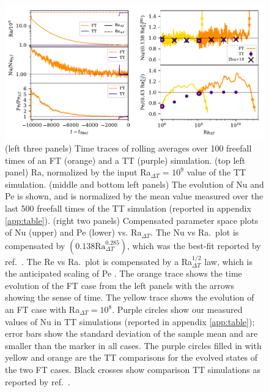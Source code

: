 \documentclass[aps, pre, onecolumn, nofootinbib, notitlepage, groupedaddress, amsfonts, amssymb, amsmath, longbibliography, superscriptaddress]{revtex4-1}
\begin{document}
\begin{figure}[b!]
\includegraphics[width=\textwidth]{./figs/rbc_scalar_comparisons.pdf}
\caption{ 
	(left three panels) Time traces of rolling averages over 100 freefall times of an FT (orange) and a TT (purple) simulation.
	(top left panel) Ra, normalized by the input Ra$_{\Delta T}$ = $10^9$ value of the TT simulation.
	(middle and bottom left panels) The evolution of Nu and Pe is shown, and is normalized by the mean value measured over the last 500 freefall times of the TT simulation (reported in appendix \ref{app:table}).
	(right two panels) Compensated parameter space plots of Nu (upper) and Pe (lower) vs. Ra$_{\Delta T}$.
	The Nu vs Ra.~plot is compensated by $(0.138 \text{Ra}_{\Delta T}^{0.285})$, which was the best-fit reported by ref.~\cite{johnston&doering2009}.
	The Re vs Ra.~plot is compensated by a Ra$_{\Delta T}^{1/2}$ law, which is the anticipated scaling of Pe \cite{ahlers&all2009}.
	The orange trace shows the time evolution of the FT case from the left panels with the arrows showing the sense of time.
	The yellow trace shows the evolution of an FT case with Ra$_{\Delta T} = 10^8$.
	Purple circles show our measured values of Nu in TT simulations (reported in appendix \ref{app:table}); error bars show the standard deviation of the sample mean and are smaller than the marker in all cases.
	The purple circles filled in with yellow and orange are the TT comparisons for the evolved states of the two FT cases.
	Black crosses show comparison TT simulations as reported by ref.~\cite{zhu&all2018}.
\label{fig:rbc_scalar_comparisons} }
\end{figure}
\end{document}
